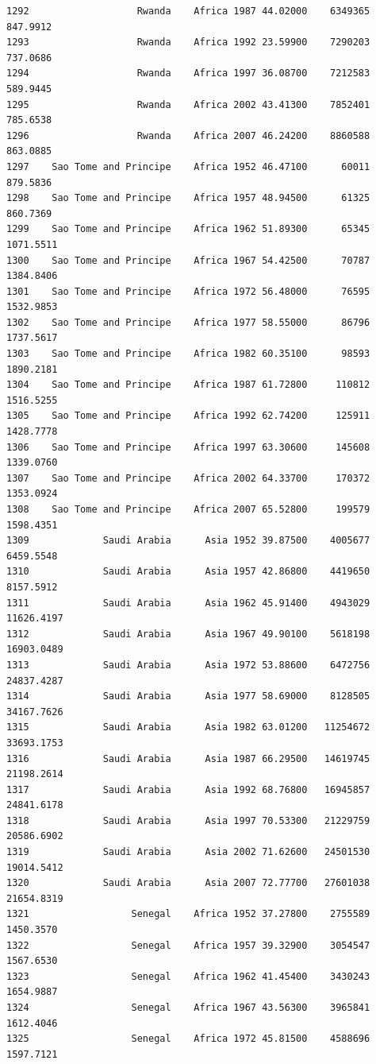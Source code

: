 \documentclass[
  letterpaper,
  DIV=11,
  numbers=noendperiod]{scrreprt}
\begin{document}
\begin{verbatim}
1292                   Rwanda    Africa 1987 44.02000    6349365    847.9912
1293                   Rwanda    Africa 1992 23.59900    7290203    737.0686
1294                   Rwanda    Africa 1997 36.08700    7212583    589.9445
1295                   Rwanda    Africa 2002 43.41300    7852401    785.6538
1296                   Rwanda    Africa 2007 46.24200    8860588    863.0885
1297    Sao Tome and Principe    Africa 1952 46.47100      60011    879.5836
1298    Sao Tome and Principe    Africa 1957 48.94500      61325    860.7369
1299    Sao Tome and Principe    Africa 1962 51.89300      65345   1071.5511
1300    Sao Tome and Principe    Africa 1967 54.42500      70787   1384.8406
1301    Sao Tome and Principe    Africa 1972 56.48000      76595   1532.9853
1302    Sao Tome and Principe    Africa 1977 58.55000      86796   1737.5617
1303    Sao Tome and Principe    Africa 1982 60.35100      98593   1890.2181
1304    Sao Tome and Principe    Africa 1987 61.72800     110812   1516.5255
1305    Sao Tome and Principe    Africa 1992 62.74200     125911   1428.7778
1306    Sao Tome and Principe    Africa 1997 63.30600     145608   1339.0760
1307    Sao Tome and Principe    Africa 2002 64.33700     170372   1353.0924
1308    Sao Tome and Principe    Africa 2007 65.52800     199579   1598.4351
1309             Saudi Arabia      Asia 1952 39.87500    4005677   6459.5548
1310             Saudi Arabia      Asia 1957 42.86800    4419650   8157.5912
1311             Saudi Arabia      Asia 1962 45.91400    4943029  11626.4197
1312             Saudi Arabia      Asia 1967 49.90100    5618198  16903.0489
1313             Saudi Arabia      Asia 1972 53.88600    6472756  24837.4287
1314             Saudi Arabia      Asia 1977 58.69000    8128505  34167.7626
1315             Saudi Arabia      Asia 1982 63.01200   11254672  33693.1753
1316             Saudi Arabia      Asia 1987 66.29500   14619745  21198.2614
1317             Saudi Arabia      Asia 1992 68.76800   16945857  24841.6178
1318             Saudi Arabia      Asia 1997 70.53300   21229759  20586.6902
1319             Saudi Arabia      Asia 2002 71.62600   24501530  19014.5412
1320             Saudi Arabia      Asia 2007 72.77700   27601038  21654.8319
1321                  Senegal    Africa 1952 37.27800    2755589   1450.3570
1322                  Senegal    Africa 1957 39.32900    3054547   1567.6530
1323                  Senegal    Africa 1962 41.45400    3430243   1654.9887
1324                  Senegal    Africa 1967 43.56300    3965841   1612.4046
1325                  Senegal    Africa 1972 45.81500    4588696   1597.7121

\end{verbatim}
\end{document}
